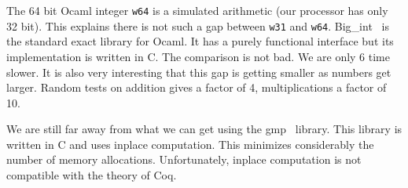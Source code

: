 The 64 bit {\sc Ocaml} integer {\tt w64} is a simulated arithmetic (our processor has only 32 bit).
This explains there is not such a gap between {\tt w31} and {\tt w64}. {\sc Big\_int}~\cite{bignum} is the  
standard exact library for {\sc Ocaml}. It has a purely functional interface but its implementation
is written in C. The comparison is not bad. We are only 6 time slower. It is also very interesting
that this gap is getting smaller as numbers get larger. Random tests on addition gives a factor of
4, multiplications a factor of 10.

We are still far away from what we can get using the {\sc gmp}~\cite{GMP} library. This library is written in
C and uses inplace computation. This minimizes considerably the number of memory allocations.
Unfortunately, inplace computation is not compatible with the theory of {\sc Coq}.

